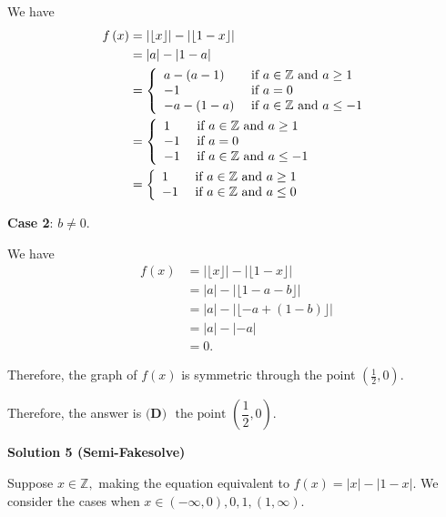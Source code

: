 \begin{enumerate}
 We have
 \begin{align*} f \left( x \right) & = \left| \lfloor x \rfloor \right| - \left| \lfloor 1 - x \rfloor \right| \\ & = | a | - | 1 - a | \\ & = \left\{ \begin{array}{ll} a - \left( a - 1 \right) & \mbox{ if } a \in \Bbb Z \mbox{ and } a \geq 1 \\ -1 & \mbox{ if } a = 0 \\ - a - \left( 1 - a \right) & \mbox{ if } a \in \Bbb Z \mbox{ and } a \leq -1 \end{array} \right. \\ & = \left\{ \begin{array}{ll} 1 & \mbox{ if } a \in \Bbb Z \mbox{ and } a \geq 1 \\ -1 & \mbox{ if } a = 0 \\ -1 & \mbox{ if } a \in \Bbb Z \mbox{ and } a \leq -1 \end{array} \right. \\ & = \left\{ \begin{array}{ll} 1 & \mbox{ if } a \in \Bbb Z \mbox{ and } a \geq 1 \\ -1 & \mbox{ if } a \in \Bbb Z \mbox{ and } a \leq 0 \end{array} \right. \end{align*}


 \textbf{Case 2}: $b \neq 0$.

 We have
 \begin{align*} f \left( x \right) & = \left| \lfloor x \rfloor \right| - \left| \lfloor 1 - x \rfloor \right| \\ & = | a | - | \lfloor 1 - a - b \rfloor | \\ & = | a | - | \lfloor - a + \left( 1 - b \right) \rfloor | \\ & = | a | - | - a | \\ & = 0 . \end{align*}


 Therefore, the graph of $f \left( x \right)$ is symmetric through the point $\left( \frac{1}{2} , 0 \right)$.

 Therefore, the answer is $\boxed{\textbf{(D) }\text{ the point }\left(\dfrac12, 0\right)}$.

 



\textbf{Solution 5 (Semi-Fakesolve)}

Suppose $x\in \mathbb{Z},$ making the equation equivalent to $f(x) = |x|-|1-x|.$ We consider the cases when $x\in (-\infty, 0), 0, 1, (1, \infty).$


\end{enumerate}
